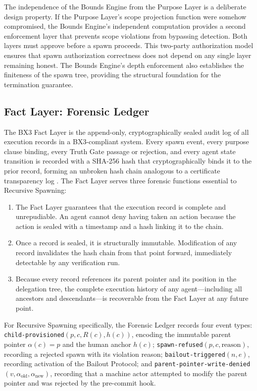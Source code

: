 The independence of the Bounds Engine from the Purpose Layer is a deliberate design property. If the Purpose Layer's scope projection function were somehow compromised, the Bounds Engine's independent computation provides a second enforcement layer that prevents scope violations from bypassing detection. Both layers must approve before a spawn proceeds. This two-party authorization model ensures that spawn authorization correctness does not depend on any single layer remaining honest. The Bounds Engine's depth enforcement also establishes the finiteness of the spawn tree, providing the structural foundation for the termination guarantee.

\subsection{Fact Layer: Forensic Ledger}

The BX3 Fact Layer is the append-only, cryptographically sealed audit log of all execution records in a BX3-compliant system. Every spawn event, every purpose clause binding, every Truth Gate passage or rejection, and every agent state transition is recorded with a SHA-256 hash that cryptographically binds it to the prior record, forming an unbroken hash chain analogous to a certificate transparency log \cite{laurie2013certificate}. The Fact Layer serves three forensic functions essential to Recursive Spawning:

\begin{enumerate}
  \item[\textbf{Completeness.}] The Fact Layer guarantees that the execution record is complete and unrepudiable. An agent cannot deny having taken an action because the action is sealed with a timestamp and a hash linking it to the chain.
  \item[\textbf{Immutability.}] Once a record is sealed, it is structurally immutable. Modification of any record invalidates the hash chain from that point forward, immediately detectable by any verification run.
  \item[\textbf{Reconstructability.}] Because every record references its parent pointer and its position in the delegation tree, the complete execution history of any agent---including all ancestors and descendants---is recoverable from the Fact Layer at any future point.
\end{enumerate}

For Recursive Spawning specifically, the Forensic Ledger records four event types: \texttt{child-provisioned}$(p, c, R(c), h(c))$, encoding the immutable parent pointer $\alpha(c) = p$ and the human anchor $h(c)$; \texttt{spawn-refused}$(p, c, \text{reason})$, recording a rejected spawn with its violation reason; \texttt{bailout-triggered}$(n, e)$, recording activation of the Bailout Protocol; and \texttt{parent-pointer-write-denied}$(v, \alpha_{\text{old}}, \alpha_{\text{new}})$, recording that a machine actor attempted to modify the parent pointer and was rejected by the pre-commit hook.

